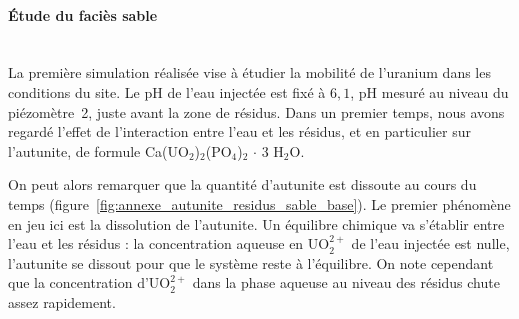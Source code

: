 \documentclass{article}
\begin{document}

\paragraph{Étude du faciès sable \\ \\}
La première simulation réalisée vise à étudier la mobilité de l’uranium dans les conditions du site. Le pH de l’eau injectée est fixé à $6,1$, pH mesuré au niveau du piézomètre~2, juste avant la zone de résidus. Dans un premier temps, nous avons regardé l’effet de l'interaction entre l’eau et les résidus, et en particulier sur l’autunite, de formule Ca(UO$_2$)$_2$(PO$_4$)$_2$ $\cdot$ 3 H$_2$O.

On peut alors remarquer que la quantité d’autunite est dissoute au cours du temps (figure~\ref{fig:annexe_autunite_residus_sable_base}). Le premier phénomène en jeu ici est la dissolution de l’autunite. Un équilibre chimique va s’établir entre l’eau et les résidus : la concentration aqueuse en UO$_2^{2+}$ de l’eau injectée est nulle, l’autunite se dissout pour que le système reste à l’équilibre. On note cependant que la concentration d'UO$_2^{2+}$ dans la phase aqueuse au niveau des résidus chute assez rapidement.
\end{document}
